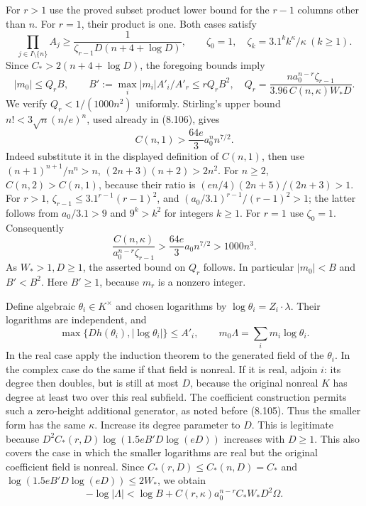 \documentclass[
  11pt,
  a4paper,
]{article}
\begin{document}
For \(r>1\) use the proved subset product lower bound for the \(r-1\)
columns other than \(n\). For \(r=1\), their product is one. Both cases
satisfy \[
\prod_{j\in I\setminus\{n\}}A_j
\ge\frac1{\zeta_{r-1}D(n+4+\log D)},\qquad
\zeta_0=1,\quad
\zeta_k=3.1^kk^\kappa/\kappa\ (k\ge1).
\] Since \(C_*>2(n+4+\log D)\), the foregoing bounds imply \[
|m_0|\le Q_rB,\qquad
B':=\max_i|m_i|A'_i/A'_r\le rQ_rB^2,
\quad
Q_r=\frac{n a_0^{n-r}\zeta_{r-1}}
{3.96\,C(n,\kappa)W_*D}.
\] We verify \(Q_r<1/(1000n^2)\) uniformly. Stirling's upper bound
\(n!<3\sqrt n(n/e)^n\), used already in (8.106), gives \[
C(n,1)>\frac{64e}{3}a_0^nn^{7/2}.
\] Indeed substitute it in the displayed definition of \(C(n,1)\), then
use \((n+1)^{n+1}/n^n>n\), \((2n+3)(n+2)>2n^2\). For \(n\ge2\),
\(C(n,2)>C(n,1)\), because their ratio is \((en/4)(2n+5)/(2n+3)>1\). For
\(r>1\), \(\zeta_{r-1}\le
3.1^{r-1}(r-1)^2\), and \((a_0/3.1)^{r-1}/(r-1)^2>1\); the latter
follows from \(a_0/3.1>9\) and \(9^k>k^2\) for integers \(k\ge1\). For
\(r=1\) use \(\zeta_0=1\). Consequently \[
\frac{C(n,\kappa)}{a_0^{n-r}\zeta_{r-1}}
>\frac{64e}{3}a_0n^{7/2}>1000n^3.
\] As \(W_*>1,D\ge1\), the asserted bound on \(Q_r\) follows. In
particular \(|m_0|<B\) and \(B'<B^2\). Here \(B'\ge1\), because \(m_r\)
is a nonzero integer.

Define algebraic \(\theta_i\in K^\times\) and chosen logarithms by
\(\log\theta_i=Z_i\cdot\lambda\). Their logarithms are independent, and
\[
\max\{Dh(\theta_i),|\log\theta_i|\}\le A'_i,\qquad
m_0\Lambda=\sum_i m_i\log\theta_i.
\] In the real case apply the induction theorem to the generated field
of the \(\theta_i\). In the complex case do the same if that field is
nonreal. If it is real, adjoin \(i\): its degree then doubles, but is
still at most \(D\), because the original nonreal \(K\) has degree at
least two over this real subfield. The coefficient construction permits
such a zero-height additional generator, as noted before (8.105). Thus
the smaller form has the same \(\kappa\). Increase its degree parameter
to \(D\). This is legitimate because \(D^2C_*(r,D)
\log(1.5eB'D\log(eD))\) increases with \(D\ge1\). This also covers the
case in which the smaller logarithms are real but the original
coefficient field is nonreal. Since \(C_*(r,D)\le C_*(n,D)=C_*\) and
\(\log(1.5eB'D\log(eD))\le2W_*\), we obtain \[
-\log|\Lambda|
<\log B+C(r,\kappa)a_0^{n-r}C_*W_*D^2\Omega.
\]
\end{document}
